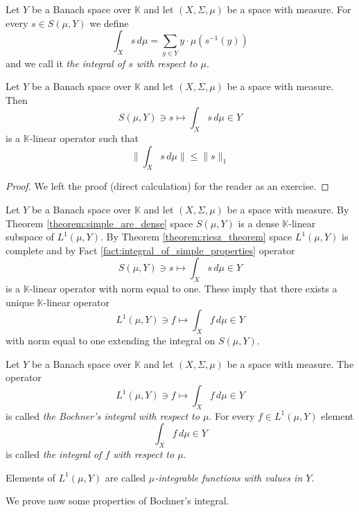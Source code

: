 \begin{definition}
    Let $Y$ be a Banach space over $\mathbb{K}$ and let $(X,\Sigma,\mu)$ be a space with measure. For every $s \in S(\mu, Y)$ we define
    $$\int_X s\,d\mu = \sum_{y\in Y}y\cdot \mu\left(s^{-1}(y)\right)$$
    and we call it \textit{the integral of $s$ with respect to $\mu$}.
\end{definition}

\begin{fact}\label{fact:integral_of_simple_properties}
    Let $Y$ be a Banach space over $\mathbb{K}$ and let $(X,\Sigma,\mu)$ be a space with measure. Then
    $$S(\mu, Y)\ni s \mapsto \int_Xs\,d\mu \in Y$$
    is a $\mathbb{K}$-linear operator such that
    $$\bigg\lVert\int_Xs\,d\mu\bigg\rVert \leq \lVert s \rVert_1$$
\end{fact}
\begin{proof}
    We left the proof (direct calculation) for the reader as an exercise.
\end{proof}
\noindent
Let $Y$ be a Banach space over $\mathbb{K}$ and let $(X,\Sigma,\mu)$ be a space with measure. By Theorem \ref{theorem:simple_are_dense} space $S(\mu, Y)$ is a dense $\mathbb{K}$-linear subspace of $L^1(\mu, Y)$. By Theorem \ref{theorem:riesz_theorem} space $L^1(\mu, Y)$ is complete and by Fact \ref{fact:integral_of_simple_properties} operator
$$S(\mu, Y)\ni s \mapsto \int_Xs\,d\mu \in Y$$
is a $\mathbb{K}$-linear operator with norm equal to one. These imply that there exists a unique $\mathbb{K}$-linear operator
$$L^1(\mu, Y)\ni f\mapsto \int_Xf\,d\mu\in Y$$
with norm equal to one extending the integral on $S(\mu, Y)$.

\begin{definition}
    Let $Y$ be a Banach space over $\mathbb{K}$ and let $(X,\Sigma,\mu)$ be a space with measure. The operator
    $$L^1(\mu, Y)\ni f\mapsto \int_Xf\,d\mu\in Y$$
    is called \textit{the Bochner's integral with respect to $\mu$}. For every $f\in L^1(\mu, Y)$ element
    $$\int_Xf\,d\mu\in Y$$
    is called \textit{the integral of $f$ with respect to $\mu$}.
\end{definition}

\begin{definition}
    Elements of $L^1(\mu,Y)$ are called \textit{$\mu$-integrable functions with values in $Y$}.
\end{definition}
\noindent
We prove now some properties of Bochner's integral. 

